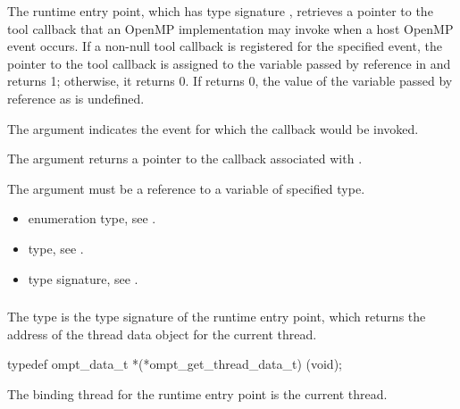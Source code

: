 \descr
The  runtime entry point, which has type signature 
, retrieves a pointer to the tool callback that
an OpenMP implementation may invoke when a host OpenMP event occurs. If a 
non-null tool callback is registered for the specified event, the pointer 
to the tool callback is assigned to the variable passed by reference in
 and  returns 1; otherwise, it returns 0. 
If  returns 0, the value of the variable passed by 
reference as  is undefined.

\argdesc
The  argument indicates the event for which the callback would 
be invoked.

The  argument returns a pointer to the callback associated 
with .

\constraints
The  argument must be a reference to a variable of specified type.

\crossreferences
\begin{itemize}
\item {} enumeration type, see .

\item {} type, see .

\item {} type signature,
see .
\end{itemize}


\subsubsection{}
\label{sec:ompt_get_thread_data_t}
\label{sec:ompt_get_thread_data}

\summary
The  type is the type signature of the 
 runtime entry point, which returns the
address of the thread data object for the current thread.

\format
\begin{ccppspecific}
\begin{omptInquiry}
typedef ompt_data_t *(*ompt_get_thread_data_t) (void);
\end{omptInquiry}
\end{ccppspecific}

\binding
The binding thread for the  runtime entry 
point is the current thread.

